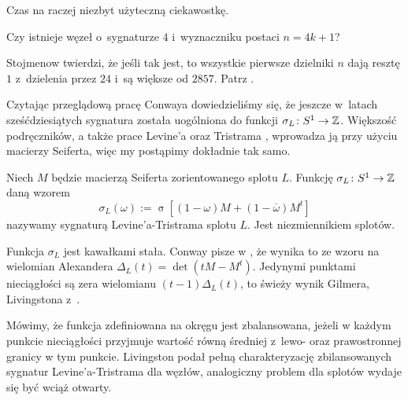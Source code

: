 Czas na raczej niezbyt użyteczną ciekawostkę.

\begin{conjecture}
    Czy istnieje węzeł o~sygnaturze $4$ i~wyznaczniku postaci $n = 4k + 1$?
\end{conjecture}

Stojmenow twierdzi, że jeśli tak jest, to wszystkie pierwsze dzielniki $n$ dają resztę $1$ z~dzielenia przez $24$ i~są większe od $2857$.
Patrz \cite[s. 540]{ohtsuki02}.

Czytając przeglądową pracę Conwaya \cite{conway19} dowiedzieliśmy się, że jeszcze w~latach sześćdziesiątych sygnatura została uogólniona do funkcji $\sigma_L \colon S^1 \to \mathbb Z$.
%
Większość podręczników, a także prace Levine'a \cite{levine69} oraz Tristrama \cite{tristram69}, wprowadza ją przy użyciu macierzy Seiferta, więc my postąpimy dokładnie tak samo.
%
%

\begin{definition}
%
    Niech $M$ będzie macierzą Seiferta zorientowanego splotu $L$.
    Funkcję $\sigma_L \colon S^1 \to \mathbb Z$ daną wzorem
    \begin{equation}
        \sigma_L(\omega) := \operatorname{\sigma} [(1-\omega) M + (1 - \overline{\omega})M^t]
    \end{equation}
    nazywamy sygnaturą Levine'a-Tristrama splotu $L$.
    Jest niezmiennikiem splotów.
\end{definition}

Funkcja $\sigma_L$ jest kawałkami stała.
Conway pisze w \cite{conway19}, że wynika to ze wzoru na wielomian Alexandera $\Delta_L(t) = \det(tM - M^t)$.
%
%
Jedynymi punktami nieciągłości są zera wielomianu $(t-1)\Delta_L(t)$, to świeży wynik Gilmera, Livingstona z~\cite{gilmer16}.
%
%

Mówimy, że funkcja zdefiniowana na okręgu jest zbalansowana, jeżeli w każdym punkcie nieciągłości przyjmuje wartość równą średniej z~lewo- oraz prawostronnej granicy w tym punkcie.
Livingston podał pełną charakteryzację zbilansowanych sygnatur Levine'a-Tristrama dla węzłów, analogiczny problem dla splotów wydaje się być wciąż otwarty.

